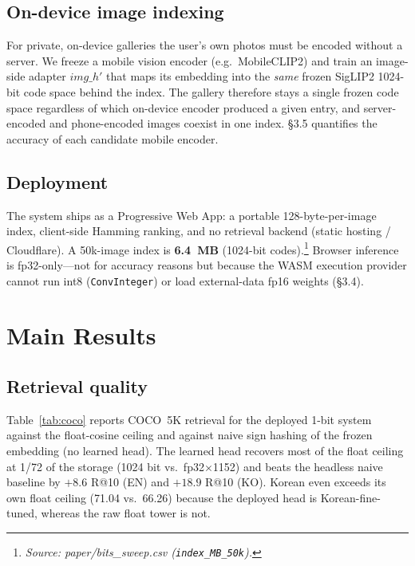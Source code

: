\documentclass[letterpaper]{article} %
\newcommand{\src}[1]{\footnotesize\textit{Source: #1.}}
\begin{document}
\subsection{On-device image indexing}
For private, on-device galleries the user's own photos must be encoded without a server. We freeze a
mobile vision encoder (e.g.\ MobileCLIP2) and train an image-side adapter $\mathit{img\_h}'$ that
maps its embedding into the \emph{same} frozen SigLIP2 1024-bit code space behind the index. The
gallery therefore stays a single frozen code space regardless of which on-device encoder produced a
given entry, and server-encoded and phone-encoded images coexist in one index. \S3.5 quantifies the
accuracy of each candidate mobile encoder.

\subsection{Deployment}
The system ships as a Progressive Web App: a portable 128-byte-per-image index, client-side Hamming
ranking, and no retrieval backend (static hosting / Cloudflare). A 50k-image index is
\textbf{6.4~MB} (1024-bit codes).\footnote{\src{paper/bits\_sweep.csv (\texttt{index\_MB\_50k})}}
Browser inference is fp32-only---not for accuracy reasons but because the WASM execution provider
cannot run int8 (\texttt{ConvInteger}) or load external-data fp16 weights (\S3.4).

\section{Main Results}
\label{sec:results}

\subsection{Retrieval quality}
Table~\ref{tab:coco} reports COCO~5K retrieval for the deployed 1-bit system against the float-cosine
ceiling and against naive sign hashing of the frozen embedding (no learned head). The learned head
recovers most of the float ceiling at 1/72 of the storage (1024 bit vs.\ fp32$\times$1152) and beats
the headless naive baseline by $+8.6$ R@10 (EN) and $+18.9$ R@10 (KO). Korean even exceeds its own
float ceiling (71.04 vs.\ 66.26) because the deployed head is Korean-fine-tuned, whereas the raw
float tower is not.
\end{document}

